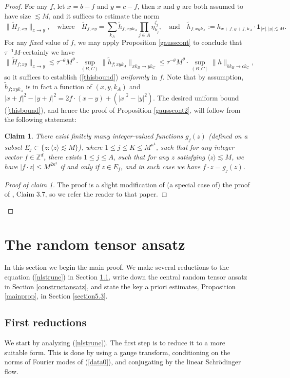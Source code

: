 \documentclass[11 pt,reqno]{amsart}
\newtheorem{claim}[thm]{Claim}
\theoremstyle{definition}
\theoremstyle{remark}
\numberwithin{equation}{section}
\newcommand{\Zb}{\mathbb{Z}}
\begin{document}
{\begin{proof}
For any $f$, let $x=b-f$ and $y=c-f$, then $x$ and $y$ are both assumed to have size $\lesssim M$, and it suffices to estimate the norm
\[\|\widetilde{H}_{f;xy}\|_{x\to y},\quad\mathrm{where}\quad \widetilde{H}_{f;xy}=\sum_{k_A}\widetilde{h}_{f;xyk_A}\prod_{j\in A}\eta_{k_j}^{\zeta_j},\quad\mathrm{and}\quad\widetilde{h}_{f;xyk_A}:=h_{x+f,y+f,k_A}\cdot\mathbf{1}_{|x|,|y|\lesssim M}.\] For any \emph{fixed} value of $f$, we may apply Proposition \ref{gausscont} to conclude that $\tau^{-1}M$-certainly we have
\begin{equation}\label{thisbound}\|\widetilde{H}_{f;xy}\|_{x\to y}\lesssim \tau^{-\theta}M^\theta \cdot \sup_{(B,C)}\|\widetilde{h}_{f;xyk_A}\|_{xk_B\to yk_C}\leq \tau^{-\theta}M^\theta\cdot \sup_{(B,C)}\|h\|_{bk_B\to ck_C},\end{equation} so it suffices to establish (\ref{thisbound}) \emph{uniformly} in $f$. Note that by assumption, $\widetilde{h}_{f;xyk_A}$ is in fact a function of $(x,y,k_A)$ and $|x+f|^2-|y+f|^2=2f\cdot(x-y)+(|x|^2-|y|^2)$. The desired uniform bound (\ref{thisbound}), and hence the proof of Proposition \ref{gausscont2}, will follow from the following statement:
\begin{claim}\label{uniformclaim} There exist finitely many integer-valued functions $g_j(z)$ (defined on a subset $E_j\subset\{z:\langle z\rangle\lesssim M\}$), where $1\leq j\leq K\leq M^{\kappa^4}$, such that for \emph{any} integer vector $f\in \Zb^d$, there exists $1\leq j\leq A$, such that for any $z$ satisfying $\langle z\rangle\lesssim M$, we have $|f\cdot z|\leq M^{2\kappa^3}$ if and only if $z\in E_j$, and in such case we have $f\cdot z=g_j(z)$.
\end{claim}
\begin{proof}[Proof of claim \ref{uniformclaim}] The proof is a slight modification of (a special case of) the proof of \cite{DH}, Claim 3.7, so we refer the reader to that paper.
\end{proof}\phantom\qedhere
\end{proof}
 \section{The random tensor ansatz}\label{ansatz} In this section we begin the main proof. We make several reductions to the equation (\ref{nlstrunc}) in Section \ref{reduct}, write down the central random tensor ansatz in Section \ref{constructansatz}, and state the key a priori estimates, Proposition \ref{mainprop}, in Section \ref{section5.3}.
 \subsection{First reductions}\label{reduct} We start by analyzing (\ref{nlstrunc}). The first step is to reduce it to a more suitable form. This is done by using a gauge transform, conditioning on the norms of Fourier modes of (\ref{data0}), and conjugating by the linear Schr\"{o}dinger flow.
}
\end{document}
